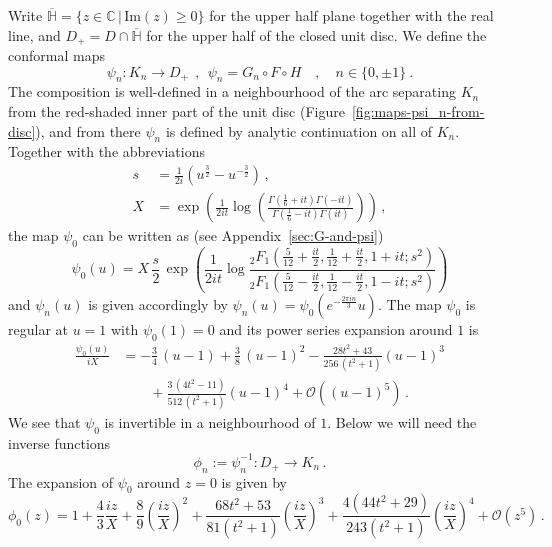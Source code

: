 \documentclass[11pt,a4paper]{article}
\numberwithin{equation}{section}
\begin{document}
Write $\overline{\mathbb{H}} = \{ z \in \mathbb{C} \,|\, \mathrm{Im}(z)\ge 0 \}$ for the upper half plane together with the real line, and $D_+ = D \cap \overline{\mathbb{H}}$ for the upper half of the closed unit disc. We define the conformal maps
\begin{equation}\label{eq:psi_n-def}
	\psi_n : K_n \to D_+
	~~,~~
	\psi_n = G_n \circ F \circ H
	\quad , \quad n \in \{ 0 , \pm1 \} ~.	
\end{equation}
The composition is well-defined in a neighbourhood of the arc separating $K_n$ from the red-shaded inner part of the unit disc 
(Figure~\ref{fig:maps-psi_n-from-disc}), and from there $\psi_n$ is defined by analytic continuation on all of $K_n$.
Together with the abbreviations 
%
\begin{align}
    s &= \frac{1}{2i} \left( u^{\frac32} - u^{-\frac32} \right) \, ,
\label{eq:s(u)}    
    \\
    X &= \exp\!\left(\frac{1}{2i t} \log\!\left(\frac{\Gamma\!\left(\frac{1}{6}+i t\right)
    \Gamma\!\left(-it\right)}{\Gamma\!\left(\frac{1}{6}-i t\right)
    \Gamma\!\left(it\right)}\right)\right)
    \, ,
    \label{eq:X(t)} 
\end{align}
%
the map $\psi_0$ can be written as (see Appendix~\ref{sec:G-and-psi})
%
\begin{equation}\label{eq:psi}
    \psi_0(u) =  X\, \frac{s}{2} \,\exp\!\left(\frac{1}{2 i t} \log\frac{_2F_1\left(\frac{5}{12}+\frac{it}2,\frac{1}{12}+\frac{i t}2,1+i t; s^2\right)}{_2F_1\left(\frac{5}{12}-\frac{i t}2,\frac{1}{12}-\frac{i t}2,1-i t; s^2\right)}\right)
\end{equation}
%
and $\psi_n(u)$ is given accordingly by $\psi_n(u) = \psi_0(e^{-\frac{2 \pi i n}3} u)$. 
The map $\psi_0$ is regular at $u=1$ with $\psi_0(1) = 0$ and its power series expansion around $1$ is
%
\begin{align}
    \frac{\psi_0(u)}{i X} &=  -\frac{3}{4}\,(u-1)   +\frac{3}{8}\,(u-1)^2  -\frac{28t^2+43}{256\,(t^2+1)}(u-1)^3 
    \nonumber \\
    &\qquad + \frac{3\,(4t^2 -11)}{512\, (t^2+1)}(u-1)^4 + \mathcal{O}\!\left((u-1)^5\right)\,.
\end{align}
%
We see that $\psi_0$ is invertible in a neighbourhood of $1$.
Below we will need the inverse functions
\begin{equation}\label{eq:phi_n-def}
\phi_n := \psi_n^{-1} : D_+ \to K_n \,.
\end{equation}
%
The expansion of $\psi_0$ around $z=0$ is given by
\begin{equation}\label{eq:phi0}
    \phi_0(z) = 1 + \frac{4}{3} \frac{i z}{X} + \frac{8}{9}\left(\frac{i z}{X}\right)^2 + \frac{68 t^2+53}{81(t^2+1)} \left(\frac{i z}{X}\right)^3 +\frac{4\left(44t^2+29\right)}{243(t^2+1)} \left(\frac{i z}{X}\right)^4 + \mathcal{O}\!\left(z^5\right)\,.
\end{equation}
\end{document}
